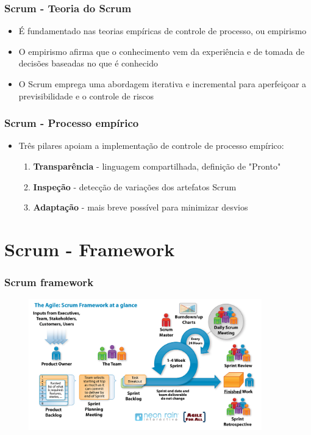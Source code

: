 \begin{frame}
 \frametitle{Scrum - Teoria do Scrum}
 \begin{itemize}
  \item É fundamentado nas teorias empíricas de controle de processo, ou empirismo
  \item O empirismo afirma que o conhecimento vem da experiência e de tomada de
decisões baseadas no que é conhecido
\item O Scrum emprega uma abordagem iterativa e
incremental para aperfeiçoar a previsibilidade e o controle de riscos
 \end{itemize}
\end{frame} 


\begin{frame}
 \frametitle{Scrum - Processo empírico}
 \begin{itemize}
  \item Três pilares apoiam a implementação de controle de processo empírico:
  \begin{enumerate}
   \item \textbf{Transparência} - linguagem compartilhada, definição de "Pronto"
   \item \textbf{Inspeção} - detecção de variações dos artefatos Scrum
   \item \textbf{Adaptação} - mais breve possível para minimizar desvios
  \end{enumerate}
 \end{itemize}
\end{frame} 


\section{Scrum - Framework}
\begin{frame}
 \frametitle{Scrum framework}
  \begin{figure}
   \centering
   \includegraphics[width = 0.9\textwidth]{figs/Scrum.jpg}
  \end{figure}
\end{frame}

